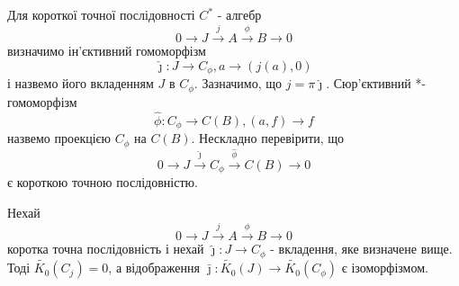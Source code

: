 Для короткої точної послідовності $C^*$ - алгебр
\begin{equation*}
    0 \to J \xrightarrow{j} A \xrightarrow{\phi} B \to 0
\end{equation*}
визначимо ін'єктивний гомоморфізм
\begin{equation*}
    \hat{\jmath}: J \to C_\phi, a \to (j(a), 0)
\end{equation*}
і назвемо його вкладенням $J$ в $C_\phi$.
Зазначимо, що $j = \pi\hat{\jmath}$.
Сюр'єктивний *-гомоморфізм
\begin{equation*}
    \hat{\phi}: C_\phi \to C(B), (a,f) \to f
\end{equation*}
назвемо проекцією $C_\phi$ на $C(B)$.
Нескладно перевірити, що
\begin{equation*}
    0 \to J \xrightarrow{\hat{\jmath}} C_\phi \xrightarrow{\hat{\phi}} C(B) \to 0
\end{equation*}
є короткою точною послідовністю.

\begin{lemma}
    Нехай
    \begin{equation*}
        0 \to J \xrightarrow{j} A \xrightarrow{\phi} B \to 0
    \end{equation*}
    коротка точна послідовність і нехай $\hat{\jmath}: J \to C_\phi$ - вкладення, яке визначене вище.
    Тоді $\widetilde{K_0}(C_j) = 0$, а відображення $\bar{\jmath}: \widetilde{K_0}(J) \to \widetilde{K_0}(C_\phi)$ є ізоморфізмом.
\end{lemma}

